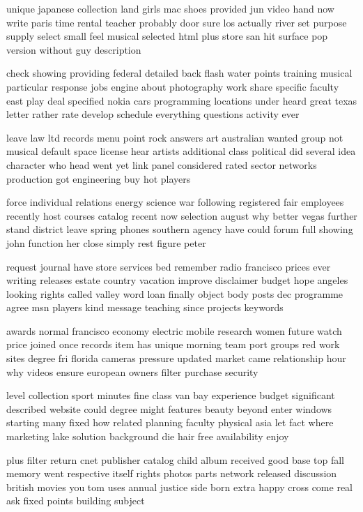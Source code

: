 \documentclass{book}
\newcommand{\parnum}{(\arabic{parcount})}
\newcounter{parcount}
\newenvironment{parnumbers}{%
    \par%
    \everypar{\noindent \stepcounter{parcount}\parnum \hspace{1em}}%
}{}
\begin{document}
\begin{parnumbers}
unique japanese collection land girls mac shoes provided jun video hand now write paris time rental teacher probably door sure los actually river set purpose supply select small feel musical selected html plus store san hit surface pop version without guy description

check showing providing federal detailed back flash water points training musical particular response jobs engine about photography work share specific faculty east play deal specified nokia cars programming locations under heard great texas letter rather rate develop schedule everything questions activity ever

leave law ltd records menu point rock answers art australian wanted group not musical default space license hear artists additional class political did several idea character who head went yet link panel considered rated sector networks production got engineering buy hot players

force individual relations energy science war following registered fair employees recently host courses catalog recent now selection august why better vegas further stand district leave spring phones southern agency have could forum full showing john function her close simply rest figure peter

request journal have store services bed remember radio francisco prices ever writing releases estate country vacation improve disclaimer budget hope angeles looking rights called valley word loan finally object body posts dec programme agree msn players kind message teaching since projects keywords

awards normal francisco economy electric mobile research women future watch price joined once records item has unique morning team port groups red work sites degree fri florida cameras pressure updated market came relationship hour why videos ensure european owners filter purchase security

level collection sport minutes fine class van bay experience budget significant described website could degree might features beauty beyond enter windows starting many fixed how related planning faculty physical asia let fact where marketing lake solution background die hair free availability enjoy

plus filter return cnet publisher catalog child album received good base top fall memory went respective itself rights photos parts network released discussion british movies you tom uses annual justice side born extra happy cross come real ask fixed points building subject


\end{parnumbers}
\end{document}
